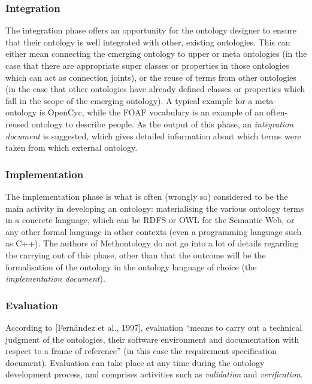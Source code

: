 \documentclass[twoside]{fast_latex}
\begin{document}
\subsubsection{Integration} %
\label{ssub:integration}

The integration phase offers an opportunity for the ontology designer to ensure that their ontology is well integrated with other, existing ontologies. This can either mean connecting the emerging ontology to upper or meta ontologies (in the case that there are appropriate super classes or properties in those ontologies which can act as connection joints), or the reuse of terms from other ontologies (in the case that other ontologies have already defined classes or properties which fall in the scope of the emerging ontology). A typical example for a meta-ontology is OpenCyc, while the FOAF vocabulary \cite{brickley2004foaf} is an example of an often-reused ontology to describe people. As the output of this phase, an \emph{integration document} is suggested, which gives detailed information about which terms were taken from which external ontology.

\subsubsection{Implementation} %
\label{ssub:implementation}

The implementation phase is what is often (wrongly so) considered to be the main activity in developing an ontology: materialising the various ontology terms in a concrete language, which can be RDFS or OWL for the Semantic Web, or any other formal language in other contexts (even a programming language such as C++). The authors of Methontology do not go into a lot of details regarding the carrying out of this phase, other than that the outcome will be the formalisation of the ontology in the ontology language of choice (the \emph{implementation document}).

\subsubsection{Evaluation} %
\label{ssub:evaluation}

According to [Fernández et  al., 1997], evaluation ``means to carry out a technical judgment of the ontologies, their software environment and documentation with respect to a frame of reference'' (in this case the requirement specification document). Evaluation can take place at any time during the ontology development process, and comprises activities such as \emph{validation} and \emph{verification}.
\end{document}

